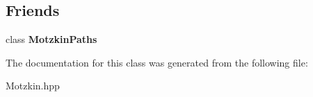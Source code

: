 \subsection*{Friends}
\begin{DoxyCompactItemize}
\item 
\hypertarget{classdis_1_1_motzkin_paths_1_1iterator_a0cb884f189893d9dd0b61104eb3a97ac}{class {\bfseries Motzkin\-Paths}}\label{classdis_1_1_motzkin_paths_1_1iterator_a0cb884f189893d9dd0b61104eb3a97ac}

\end{DoxyCompactItemize}


The documentation for this class was generated from the following file\-:\begin{DoxyCompactItemize}
\item 
Motzkin.\-hpp\end{DoxyCompactItemize}
